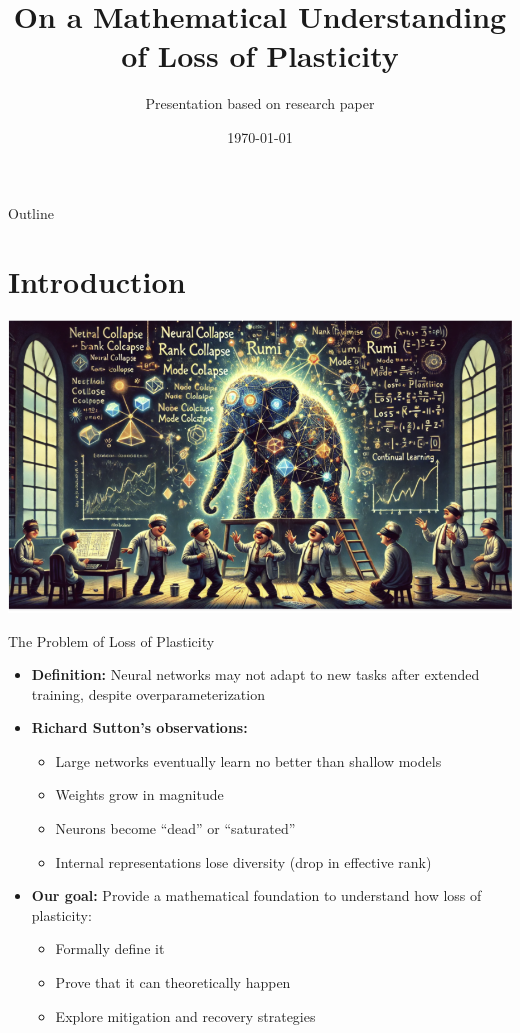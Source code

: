 \documentclass{beamer}
\title{On a Mathematical Understanding of Loss of Plasticity}
\author{Presentation based on research paper}
\date{\today}
\begin{document}
\begin{frame}
    \titlepage
\end{frame}

\begin{frame}{Outline}
    \tableofcontents
\end{frame}

\section{Introduction}

\begin{frame}{}
    \includegraphics[width=\textwidth]{images/fun.png}
\end{frame}

\begin{frame}{The Problem of Loss of Plasticity}
    \begin{itemize}
        \item \textbf{Definition:} Neural networks may not adapt to new tasks after extended training, despite overparameterization
        \item \textbf{Richard Sutton's observations:}
        \begin{itemize}
            \item Large networks eventually learn no better than shallow models
            \item Weights grow in magnitude
            \item Neurons become ``dead'' or ``saturated''
            \item Internal representations lose diversity (drop in effective rank)
        \end{itemize}
        \item \textbf{Our goal:} Provide a mathematical foundation to understand how loss of plasticity:
        \begin{itemize}
            \item Formally define it
            \item Prove that it can theoretically happen
            \item Explore mitigation and recovery strategies
        \end{itemize}
    \end{itemize}
\end{frame}
\end{document}
